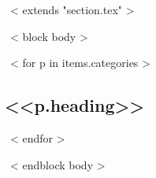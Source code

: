 ~< extends "section.tex" >~

~< block body >~
\renewcommand*{\bibfont}{\small}

~< for p in items.categories >~
\subsection{<<p.heading>>}
\begin{refsection}
  \nocite{*}
  \printbibliography[heading=none,prefixnumbers=<<p.prefix>>]
\end{refsection}

~< endfor >~

~< endblock body >~
